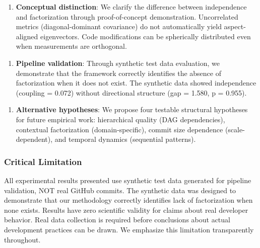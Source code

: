 \begin{enumerate}
\item \textbf{Conceptual distinction}: We clarify the difference between independence and factorization through proof-of-concept demonstration. Uncorrelated metrics (diagonal-dominant covariance) do not automatically yield aspect-aligned eigenvectors. Code modifications can be spherically distributed even when measurements are orthogonal.
\end{enumerate}

\begin{enumerate}
\item \textbf{Pipeline validation}: Through synthetic test data evaluation, we demonstrate that the framework correctly identifies the absence of factorization when it does not exist. The synthetic data showed independence (coupling = 0.072) without directional structure (gap = 1.580, p = 0.955).
\end{enumerate}

\begin{enumerate}
\item \textbf{Alternative hypotheses}: We propose four testable structural hypotheses for future empirical work: hierarchical quality (DAG dependencies), contextual factorization (domain-specific), commit size dependence (scale-dependent), and temporal dynamics (sequential patterns).
\end{enumerate}

\subsubsection{Critical Limitation}

All experimental results presented use synthetic test data generated for pipeline validation, NOT real GitHub commits. The synthetic data was designed to demonstrate that our methodology correctly identifies lack of factorization when none exists. Results have zero scientific validity for claims about real developer behavior. Real data collection is required before conclusions about actual development practices can be drawn. We emphasize this limitation transparently throughout.
